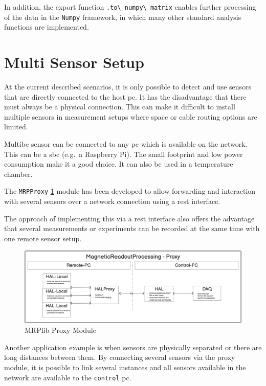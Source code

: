 In addition, the export function
\passthrough{\lstinline!.to\_numpy\_matrix!} enables further processing
of the data in the \passthrough{\lstinline!Numpy!}
\cite{harris2020array} framework, in which many other standard
analysis functions are implemented.

\hypertarget{multi-sensor-setup}{%
\section{Multi Sensor Setup}\label{multi-sensor-setup}}

At the current described scenarios, it is only possible to detect and
use sensors that are directly connected to the host \gls{pc}. It has the
disadvantage that there must always be a physical connection. This can
make it difficult to install multiple sensors in measurement setups
where space or cable routing options are limited.

Multibe sensor can be connected to any \gls{pc} which is available on
the network. This can be a \gls{sbc} (e.g.~a Raspberry Pi). The small
footprint and low power consumption make it a good choice. It can also
be used in a temperature chamber.

The \passthrough{\lstinline!MRPProxy!} \ref{MRPlib_Proxy_Module.png}
module has been developed to allow forwarding and interaction with
several sensors over a network connection using a \gls{rest} interface.

The approach of implementing this via a \gls{rest} interface also offers
the advantage that several measurements or experiments can be recorded
at the same time with one remote sensor setup.

\begin{figure}
\centering
\includegraphics{./generated_images/border_MRPlib_Proxy_Module.png}
\caption{MRPlib Proxy Module \label{MRPlib_Proxy_Module.png}}
\end{figure}

Another application example is when sensors are physically separated or
there are long distances between them. By connecting several sensors via
the proxy module, it is possible to link several instances and all
sensors available in the network are available to the
\passthrough{\lstinline!control!} \gls{pc}.

